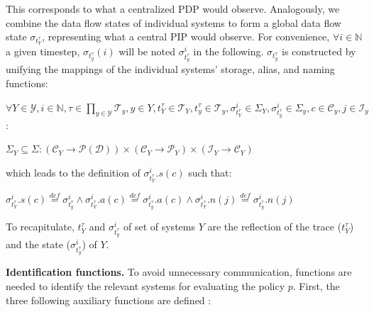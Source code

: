 This corresponds to what a centralized PDP would observe.
Analogously, we combine the data flow states of individual systems to form a global data flow state $\sigma_{t_{Y}^{\tau}}$, representing what a central PIP would observe. For convenience, $\forall i \in \mathbb{N}$ a given timestep, $\sigma_{t_{y}^{\tau}}(i)$ will be noted $\sigma_{t_{y}^{\tau}}^{i}$ in the following. $\sigma_{t_{y}^{\tau}}$  is constructed by unifying the mappings of the individual systems’ storage, alias, and naming functions:


\begin{center}
\begin{small}
    $\forall Y \in \mathcal{Y}, i \in \mathbb{N}, \tau \in \prod_{y \in \mathcal{Y}}\mathcal{T}_{y}, y \in Y, t_{Y}^{\tau} \in \mathcal{T}_{Y}, t_{y}^{\tau} \in \mathcal{T}_{y}, \sigma_{t_{Y}^{\tau}}^{i} \in \Sigma_{Y}, \sigma_{t_{y}^{\tau}}^{i} \in \Sigma_{y}, c \in \mathcal{C}_{y}, j \in \mathcal{I}_{y}$:
\end{small}    
$\Sigma_{Y} \subseteq \Sigma : (\mathcal{C}_{Y} \to \mathcal{P}(\mathcal{D})) \times (\mathcal{C}_{Y} \to \mathcal{P}_{Y}) \times (\mathcal{I}_{Y} \to \mathcal{C}_{Y})$
\end{center}
which leads to the definition of $\sigma_{t_{Y}^{\tau}}^{i}.s(c)$ such that: 
\begin{center}
    $\sigma_{t_{Y}^{\tau}}^{i}.s(c) \overset{def}{=} \sigma_{t_{y}^{\tau}}^{i} \wedge \sigma_{t_{Y}^{\tau}}^{i}.a(c) \overset{def}{=} \sigma_{t_{y}^{\tau}}^{i}.a(c) \wedge \sigma_{t_{Y}^{\tau}}^{i}.n(j) \overset{def}{=} \sigma_{t_{y}^{\tau}}^{i}.n(j)$
\end{center}

To recapitulate, $t_{Y}^{\tau}$ and $\sigma_{t_{y}^{\tau}}^{i}$ of set of systems $Y$ are the reflection of the trace ($t_{Y}^{\tau}$) and the state ($\sigma_{t_{y}^{\tau}}^{i}$) of $Y$.

\textbf{Identification functions.} To avoid unnecessary communication, functions are needed to identify the relevant systems for evaluating the policy $p$. First, the three following auxiliary functions are defined \cite{Kelbert2018}:

